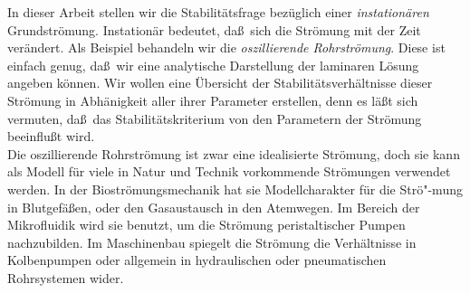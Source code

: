 \documentclass[10pt,a5paper,oneside,draft]{book}
\numberwithin{equation}{chapter}
\begin{document}
In dieser Arbeit stellen wir die Stabilit\"atsfrage bez\"uglich einer \textit{instation\"aren} Grundstr\"omung.
Instation\"ar bedeutet, da\ss\ sich die Str\"omung mit der Zeit ver\"andert.
Als Beispiel behandeln wir die \textit{oszillierende Rohrstr\"omung}.
Diese ist einfach genug, da\ss\ wir eine analytische Darstellung der laminaren L\"osung angeben k\"onnen.
Wir wollen eine \"Ubersicht der Stabilit\"atsverh\"altnisse dieser Str\"omung in Abh\"anigkeit aller ihrer Parameter erstellen, denn es l\"a\ss t sich vermuten, da\ss\ das Stabilit\"atskriterium von den Parametern der Str\"omung beeinflu\ss t wird.\\

Die oszillierende Rohrstr\"omung ist zwar eine idealisierte Str\"omung, doch sie kann als Modell f\"ur viele in Natur und Technik vorkommende Str\"omungen verwendet werden.
In der Biostr\"omungsmechanik hat sie Modellcharakter f\"ur die Str\"o"-mung in Blutgef\"a\ss en, oder den Gasaustausch in den Atemwegen.
Im Bereich der Mikrofluidik wird sie benutzt, um die Str\"omung peristaltischer Pumpen nachzubilden.
Im Maschinenbau spiegelt die Str\"omung die Verh\"altnisse in Kolbenpumpen oder allgemein in hydraulischen oder pneumatischen Rohrsystemen wider.\\
\end{document}
